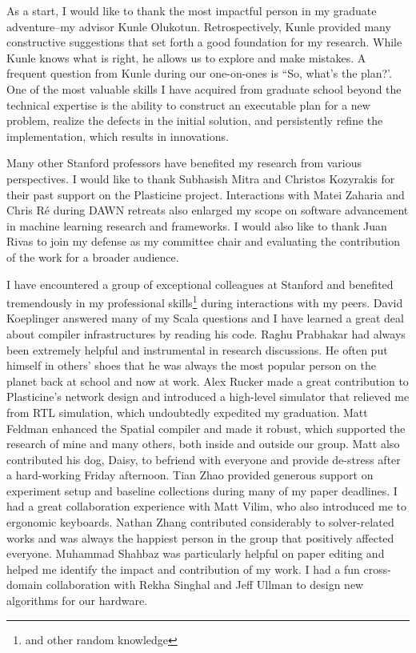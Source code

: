 
As a start, I would like to thank the most impactful person in my graduate adventure--my advisor
Kunle Olukotun.
Retrospectively, Kunle provided many constructive suggestions that set forth a good foundation for my research.
While Kunle knows what is right, he allows us to explore and make mistakes.
A frequent question from Kunle during our one-on-ones is ``So, what's the plan?'.
One of the most valuable skills I have acquired from graduate school beyond the technical expertise is the ability to construct an executable plan for a new problem, realize the defects in the initial solution, and persistently refine the implementation, which results in innovations.

Many other Stanford professors have benefited my research from various perspectives.
I would like to thank Subhasish Mitra and Christos Kozyrakis for their past support on the
Plasticine project.
Interactions with Matei Zaharia and Chris R\'e during DAWN retreats also enlarged my scope on 
software advancement in machine learning research and frameworks.
I would also like to thank Juan Rivas to join my defense as my committee chair and evaluating the
contribution of the work for a broader audience.

I have encountered a group of exceptional colleagues at Stanford and
benefited tremendously in my professional skills\footnote{and other random knowledge} during interactions with my peers.
David Koeplinger answered many of my Scala questions and I have learned a great deal about compiler
infrastructures by reading his code.
Raghu Prabhakar had always been extremely helpful and instrumental in research discussions. 
He often put himself in others' shoes that he was always the most popular person on the planet back at school and now at work.
Alex Rucker made a great contribution to Plasticine's network design and introduced a high-level simulator that relieved me from RTL simulation, which undoubtedly expedited my graduation.
Matt Feldman enhanced the Spatial compiler and made it robust, which supported the research of mine and many
others, both inside and outside our group.
Matt also contributed his dog, Daisy, to befriend with everyone and 
provide de-stress after a hard-working Friday afternoon.
Tian Zhao provided generous support on experiment setup and baseline collections during many of my paper deadlines.
I had a great collaboration experience with Matt Vilim, who also introduced me to ergonomic keyboards.
Nathan Zhang contributed considerably to solver-related works and was always the happiest person in the group that positively affected everyone.
Muhammad Shahbaz was particularly helpful on paper editing and helped me identify the impact and contribution of my work.
I had a fun cross-domain collaboration with Rekha Singhal and Jeff Ullman to design new algorithms for our
hardware.

